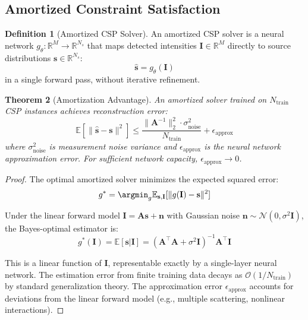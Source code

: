 \documentclass[11pt,a4paper]{article}
\newtheorem{theorem}{Theorem}[section]
\theoremstyle{definition}
\newtheorem{definition}[theorem]{Definition}
\theoremstyle{remark}
\newcommand{\R}{\mathbb{R}}
\newcommand{\params}{\theta}
\begin{document}
\subsection{Amortized Constraint Satisfaction}

\begin{definition}[Amortized CSP Solver]
\label{def:amortized}
An amortized CSP solver is a neural network $g_\params: \R^M \to \R^{N_s}$ that maps detected intensities $\mathbf{I} \in \R^M$ directly to source distributions $\mathbf{s} \in \R^{N_s}$:
\begin{equation}
\hat{\mathbf{s}} = g_\params(\mathbf{I})
\end{equation}
in a single forward pass, without iterative refinement.
\end{definition}

\begin{theorem}[Amortization Advantage]
\label{thm:amortization}
An amortized solver trained on $N_{\text{train}}$ CSP instances achieves reconstruction error:
\begin{equation}
\mathbb{E}[\|\hat{\mathbf{s}} - \mathbf{s}\|^2] \leq \frac{\|\mathbf{A}^{-1}\|_2^2 \cdot \sigma_{\text{noise}}^2}{N_{\text{train}}} + \epsilon_{\text{approx}}
\end{equation}
where $\sigma_{\text{noise}}^2$ is measurement noise variance and $\epsilon_{\text{approx}}$ is the neural network approximation error. For sufficient network capacity, $\epsilon_{\text{approx}} \to 0$.
\end{theorem}

\begin{proof}
The optimal amortized solver minimizes the expected squared error:
\begin{equation}
g^* = \argmin_g \mathbb{E}_{\mathbf{s}, \mathbf{I}}[\|g(\mathbf{I}) - \mathbf{s}\|^2]
\end{equation}

Under the linear forward model $\mathbf{I} = \mathbf{A}\mathbf{s} + \mathbf{n}$ with Gaussian noise $\mathbf{n} \sim \mathcal{N}(0, \sigma^2 \mathbf{I})$, the Bayes-optimal estimator is:
\begin{equation}
g^*(\mathbf{I}) = \mathbb{E}[\mathbf{s} | \mathbf{I}] = (\mathbf{A}^\top \mathbf{A} + \sigma^2 \mathbf{I})^{-1} \mathbf{A}^\top \mathbf{I}
\end{equation}

This is a linear function of $\mathbf{I}$, representable exactly by a single-layer neural network. The estimation error from finite training data decays as $\mathcal{O}(1/N_{\text{train}})$ by standard generalization theory. The approximation error $\epsilon_{\text{approx}}$ accounts for deviations from the linear forward model (e.g., multiple scattering, nonlinear interactions).
\end{proof}
\end{document}
